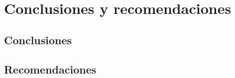 \documentclass[../0000.tex]{subfiles}
\begin{document}

\chapter{Conclusiones y recomendaciones}\label{ch:conclusions}
\section{Conclusiones}

\section{Recomendaciones}

\ifSubfilesClassLoaded{}{}
\end{document}
